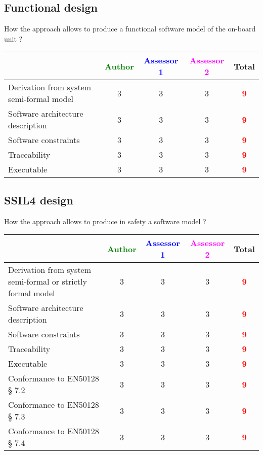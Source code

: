 \subsection{Functional design}

How the approach allows to  produce a functional software model of the on-board unit ?

\begin{tabular}{|l | c | c | c | c|}
\hline
& \textcolor{green}{Author} & \textcolor{blue}{Assessor 1} & \textcolor{magenta}{Assessor 2} & Total \\
\hline
Derivation from system semi-formal model  & 3     & 3     & 3     & \textcolor{red}{\textbf{9}} \\
\hline 
Software architecture description  & 3     & 3     & 3     & \textcolor{red}{\textbf{9}} \\
\hline
Software constraints  & 3     & 3     & 3     & \textcolor{red}{\textbf{9}} \\
\hline
Traceability  & 3     & 3     & 3     & \textcolor{red}{\textbf{9}} \\
\hline
Executable  & 3      & 3     & 3     & \textcolor{red}{\textbf{9}} \\
\hline
\end{tabular}

\subsection{SSIL4 design}

How the approach allows to  produce in safety a software model ?

\begin{tabular}{|l | c | c | c | c|}
\hline
& \textcolor{green}{Author} & \textcolor{blue}{Assessor 1} & \textcolor{magenta}{Assessor 2} & Total \\
\hline
Derivation from system semi-formal or strictly formal model  & 3     & 3     & 3     & \textcolor{red}{\textbf{9}} \\
\hline 
Software architecture description  & 3     & 3     & 3     & \textcolor{red}{\textbf{9}} \\
\hline
Software constraints  & 3     & 3     & 3     & \textcolor{red}{\textbf{9}} \\
\hline
Traceability  & 3     & 3     & 3     & \textcolor{red}{\textbf{9}}  \\
\hline
Executable  & 3     & 3     & 3     & \textcolor{red}{\textbf{9}} \\
\hline
Conformance to EN50128 § 7.2  & 3     & 3     & 3     & \textcolor{red}{\textbf{9}} \\
\hline
Conformance to EN50128 § 7.3  & 3     & 3     & 3     & \textcolor{red}{\textbf{9}} \\
\hline
Conformance to EN50128 § 7.4  & 3     & 3     & 3     & \textcolor{red}{\textbf{9}} \\
\hline
\end{tabular}

